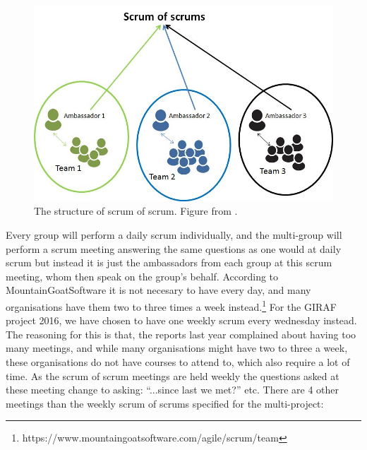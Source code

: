 \begin{figure}
\centering
\includegraphics[scale=0.4]{figures/scrumofscrum.png}
\caption{The structure of scrum of scrum. Figure from \cite{scrumofscrumfigure}.}
\label{fig:scrumofscrum}
\end{figure}

Every group will perform a daily scrum individually, and the multi-group will perform a scrum meeting answering the same questions as one would at daily scrum but instead it is just the ambassadors from each group at this scrum meeting, whom then speak on the group's behalf.
According to MountainGoatSoftware it is not necesary to have every day, and many organisations have them two to three times a week instead.\footnote{https://www.mountaingoatsoftware.com/agile/scrum/team}
For the GIRAF project 2016, we have chosen to have one weekly scrum every wednesday instead.
The reasoning for this is that, the reports last year complained about having too many meetings, and while many organisations might have two to three a week, these organisations do not have courses to attend to, which also require a lot of time.
As the scrum of scrum meetings are held weekly the questions asked at these meeting change to asking: ``...since last we met?'' etc.
There are 4 other meetings than the weekly scrum of scrums specified for the multi-project:

